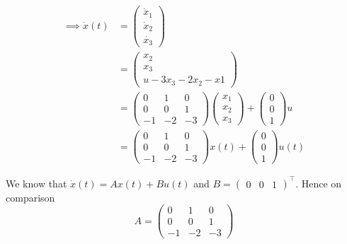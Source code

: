 \documentclass[journal,12pt,twocolumn]{IEEEtran}
\begin{document}
\begin{align}
    \implies \dot{x}(t) &= \begin{pmatrix} \dot{x}_1\\\dot{x}_2\\\dot{x_3}\end{pmatrix} \\
                        &= \begin{pmatrix} x_2\\x_3\\u-3x_3-2x_2-x1\end{pmatrix}\\
                        &= \begin{pmatrix}0 & 1 & 0\\ 0 & 0 & 1 \\ -1 & -2 & -3 \end{pmatrix} \begin{pmatrix}x_1\\x_2\\x_3\end{pmatrix}+\begin{pmatrix}0 \\ 0 \\ 1\end{pmatrix}u\\
                        &= \begin{pmatrix}0 & 1 & 0\\ 0 & 0 & 1 \\ -1 & -2 & -3 \end{pmatrix}x(t) + \begin{pmatrix}0 \\ 0 \\ 1\end{pmatrix}u(t)
\end{align}

We know that $\dot{x}(t) = Ax(t)+Bu(t)$ and $B = \begin{pmatrix} 0 & 0 &  1\end{pmatrix}^\top$. Hence on comparison
\begin{equation}
    A = \begin{pmatrix}0 & 1 & 0\\ 0 & 0 & 1 \\ -1 & -2 & -3 \end{pmatrix}
\end{equation}
\end{document}
